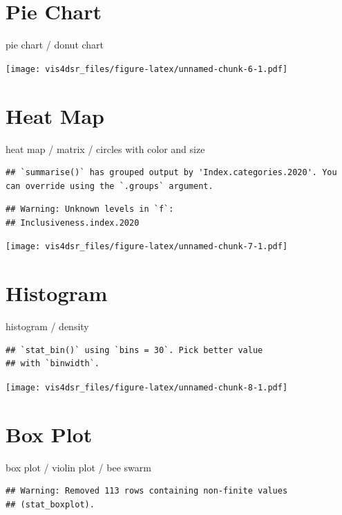 \documentclass[
]{krantz}
\begin{document}
\hypertarget{pie-chart}{%
\section{Pie Chart}\label{pie-chart}}

pie chart / donut chart

\texttt{[image: vis4dsr\_files/figure-latex/unnamed-chunk-6-1.pdf]}

\hypertarget{heat-map}{%
\section{Heat Map}\label{heat-map}}

heat map / matrix / circles with color and size

\begin{verbatim}
## `summarise()` has grouped output by 'Index.categories.2020'. You can override using the `.groups` argument.
\end{verbatim}

\begin{verbatim}
## Warning: Unknown levels in `f`:
## Inclusiveness.index.2020
\end{verbatim}

\texttt{[image: vis4dsr\_files/figure-latex/unnamed-chunk-7-1.pdf]}

\hypertarget{histogram}{%
\section{Histogram}\label{histogram}}

histogram / density

\begin{verbatim}
## `stat_bin()` using `bins = 30`. Pick better value
## with `binwidth`.
\end{verbatim}

\texttt{[image: vis4dsr\_files/figure-latex/unnamed-chunk-8-1.pdf]}

\hypertarget{box-plot}{%
\section{Box Plot}\label{box-plot}}

box plot / violin plot / bee swarm

\begin{verbatim}
## Warning: Removed 113 rows containing non-finite values
## (stat_boxplot).
\end{verbatim}
\end{document}
